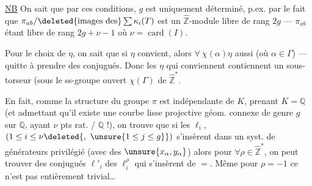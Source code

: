 \uline{NB} On sait que par ces conditions, \(g\) est uniquement déterminé,
p.ex. par le fait que
\(\pi_{ab}/\deleted{\text{images des}}\sum\kappa_i(T)\)
est un \(\widehat{\mathbb Z}\)-module libre de rang \(2g\) --- \(\pi_{ab}\)
étant libre de rang \(2g+\nu-1\) où \(\nu=\operatorname{card}(I)\).

Pour le choix de \(\eta\), on sait que si \(\eta\) convient, alors
\(\forall\ \chi(\alpha)\eta\) aussi (où \(\alpha\in\Gamma\)) --- quitte à prendre
des conjugués. Donc les \(\eta\) qui conviennent  contiennent
un sous-torseur (sous le ss-groupe ouvert
\(\chi(\Gamma)\) de \(\widehat{\mathbb Z}^{*}\).





En fait, comme la structure du groupe \(\pi\) est indépendante de \(K\),
prenant \(K=\mathbb Q\) (et admettant qu'il existe une courbe lisse projective
géom. connexe de genre \(g\) sur \(\mathbb Q\), ayant \(\nu\) pts rat. / \(\mathbb Q\) !),
on trouve que si les \(\ell_i\), 
\((1\leq i\leq\nu\deleted{,\ \unsure{1\leq j\leq g}})\)
 s'insèrent dans un syst. de générateurs
privilégié (avec des \(\unsure{x_\alpha,y_\alpha}\)) alors pour
\(\forall\rho\in\widehat{\mathbb Z}^{*}\), on peut trouver des conjugués
\(\ell'_i\) des \(\ell_i^\rho\) qui s'insèrent de \(=\).
Même pour \(\rho=-1\) ce n'est pas entièrement trivial\ldots


